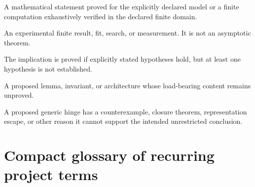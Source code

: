 \documentclass[11pt]{article}
\theoremstyle{plain}
\theoremstyle{definition}
\theoremstyle{remark}
\begin{document}
\begin{description}[leftmargin=1.8em,style=nextline]
\item[PROVED/EXACT]
A mathematical statement proved for the explicitly declared model or a finite
computation exhaustively verified in the declared finite domain.

\item[COMPUTATIONAL]
An experimental finite result, fit, search, or measurement. It is not an
asymptotic theorem.

\item[CONDITIONAL]
The implication is proved if explicitly stated hypotheses hold, but at least
one hypothesis is not established.

\item[CANDIDATE]
A proposed lemma, invariant, or architecture whose load-bearing content remains
unproved.

\item[FALSIFIED/RETIRED]
A proposed generic hinge has a counterexample, closure theorem, representation
escape, or other reason it cannot support the intended unrestricted
conclusion.
\end{description}

\section{Compact glossary of recurring project terms}
\end{document}
